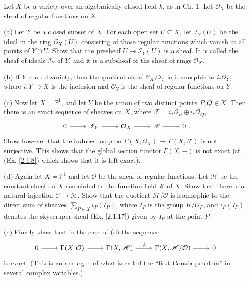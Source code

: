 \begin{exe}
	\label{2.1.21}
	Let $X$ be a variety over an algebraically closed field $k$, as in \textup{Ch. 1}. Let $\mathcal{O}_X$ be the sheaf of regular functions on $X$.
	
	(a) Let $Y$ be a closed subset of $X$. For each open set $U\subseteq X$, let $\mathscr{I}_Y(U)$ be the ideal in the ring $\mathcal{O}_X(U)$ consisting of those regular functions which vanish at all points of $Y\cap U$. Show that the presheaf $U\to\mathscr{I}_Y(U)$ is a sheaf. It is called the \textup{sheaf of ideals} $\mathscr{I}_Y$ of $Y$, and it is a subsheaf of the sheaf of rings $\mathcal{O}_X$.
	
	(b) If $Y$ is a subvariety, then the quotient sheaf $\mathcal{O}_X/\mathscr{I}_Y$ is isomorphic to $i_*\mathcal{O}_Y$, where $i:Y\to X$ is the inclusion and $\mathcal{O}_Y$ is the sheaf of regular functions on $Y$.
	
	(c) Now let $X=\mathbb{P}^1$, and let $Y$ be the union of two distinct points $P,Q\in X$. Then there is an exact sequence of sheaves on $X$, where $\mathscr{F}=i_*\mathcal{O}_P\oplus i_*\mathcal{O}_Q$,
	\begin{equation*}
		\begin{tikzcd}
			0 \arrow[r] & \mathscr{I}_Y \arrow[r] & \mathcal{O}_X \arrow[r] & \mathscr{F} \arrow[r] & 0
		\end{tikzcd}.
	\end{equation*}
	Show however that the induced map on $\Gamma(X,\mathcal{O}_X)\to\Gamma(X,\mathscr{F})$ is not surjective. This shows that the global section functor $\Gamma(X,-)$ is not exact \textup{(cf. (Ex. \ref{2.1.8}) which shows that it is left exact)}.
	
	(d) Again let $X=\mathbb{P}^1$ and let $\mathcal{O}$ be the sheaf of regular functions. Let $\mathscr{H}$ be the constant sheaf on $X$ associated to the function field $K$ of $X$. Show that there is a natural injection $\mathcal{O}\to\mathscr{H}$. Show that the quotient $\mathscr{H}/\mathcal{O}$ is isomorphic to the direct sum of sheaves $\sum_{P\in X}i_P(I_P)$, where $I_P$ is the group $K/\mathcal{O}_P$, and $i_P(I_P)$ denotes the skyscraper sheaf \textup{(Ex. \ref{2.1.17})} given by $I_P$ at the point $P$.
	
	(e) Finally show that in the case of (d) the sequence
	\begin{equation*}
		\begin{tikzcd}
			0 \arrow[r] & {\Gamma(X,\mathcal{O})} \arrow[r] & {\Gamma(X,\mathscr{H})} \arrow[r, "\psi"] & {\Gamma(X,\mathscr{H}/\mathcal{O})} \arrow[r] & 0
		\end{tikzcd}
	\end{equation*}
	is exact. \textup{(This is an analogue of what is called the ``first Cousin problem'' in several complex variables.)}
\end{exe}

